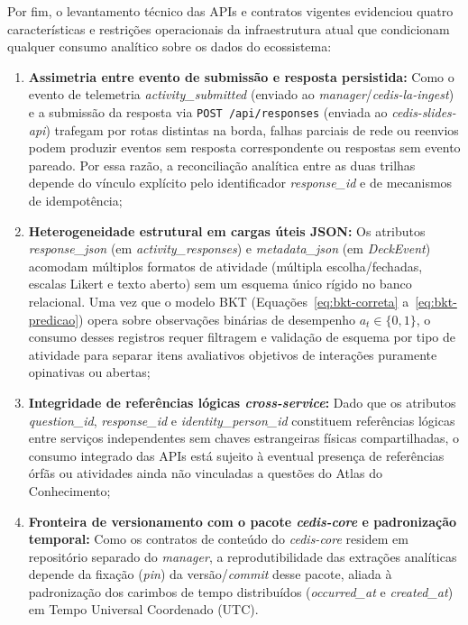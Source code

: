 Por fim, o levantamento técnico das APIs e contratos vigentes evidenciou quatro características e restrições operacionais da infraestrutura atual que condicionam qualquer consumo analítico sobre os dados do ecossistema:
\begin{enumerate}
    \item \textbf{Assimetria entre evento de submissão e resposta persistida:} Como o evento de telemetria \textit{activity\_submitted} (enviado ao \textit{manager}/\textit{cedis-la-ingest}) e a submissão da resposta via \texttt{POST /api/responses} (enviada ao \textit{cedis-slides-api}) trafegam por rotas distintas na borda, falhas parciais de rede ou reenvios podem produzir eventos sem resposta correspondente ou respostas sem evento pareado. Por essa razão, a reconciliação analítica entre as duas trilhas depende do vínculo explícito pelo identificador \textit{response\_id} e de mecanismos de idempotência;
    \item \textbf{Heterogeneidade estrutural em cargas úteis JSON:} Os atributos \textit{response\_\allowbreak json} (em \textit{activity\_responses}) e \textit{metadata\_json} (em \textit{DeckEvent}) acomodam múltiplos formatos de atividade (múltipla escolha/fechadas, escalas Likert e texto aberto) sem um esquema único rígido no banco relacional. Uma vez que o modelo BKT (Equações~\ref{eq:bkt-correta} a~\ref{eq:bkt-predicao}) opera sobre observações binárias de desempenho $a_t \in \{0, 1\}$, o consumo desses registros requer filtragem e validação de esquema por tipo de atividade para separar itens avaliativos objetivos de interações puramente opinativas ou abertas;
    \item \textbf{Integridade de referências lógicas \textit{cross-service}:} Dado que os atributos \textit{question\_id}, \textit{response\_id} e \textit{identity\_person\_id} constituem referências lógicas entre serviços independentes sem chaves estrangeiras físicas compartilhadas, o consumo integrado das APIs está sujeito à eventual presença de referências órfãs ou atividades ainda não vinculadas a questões do Atlas do Conhecimento;
    \item \textbf{Fronteira de versionamento com o pacote \textit{cedis-core} e padronização temporal:} Como os contratos de conteúdo do \textit{cedis-core} residem em repositório separado do \textit{manager}, a reprodutibilidade das extrações analíticas depende da fixação (\textit{pin}) da versão/\textit{commit} desse pacote, aliada à padronização dos carimbos de tempo distribuídos (\textit{occurred\_at} e \textit{created\_at}) em Tempo Universal Coordenado (UTC).
\end{enumerate}

